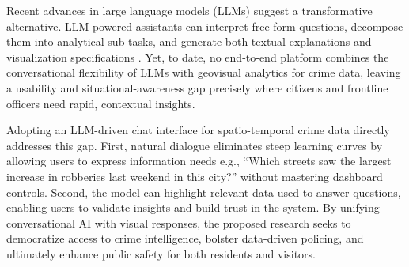 Recent advances in large language models (LLMs) suggest a transformative alternative. LLM-powered assistants can interpret free-form questions, decompose them into analytical sub-tasks, and generate both textual explanations and visualization specifications \cite{Zhang2024NLITabular}. Yet, to date, no end-to-end platform combines the conversational flexibility of LLMs with geovisual analytics for crime data, leaving a usability and situational-awareness gap precisely where citizens and frontline officers need rapid, contextual insights.

Adopting an LLM-driven chat interface for spatio-temporal crime data directly addresses this gap. First, natural dialogue eliminates steep learning curves by allowing users to express information needs e.g., “Which streets saw the largest increase in robberies last weekend in this city?” without mastering dashboard controls.  Second, the model can highlight relevant data used to answer questions, enabling users to validate insights and build trust in the system. By unifying conversational AI with visual responses, the proposed research seeks to democratize access to crime intelligence, bolster data-driven policing, and ultimately enhance public safety for both residents and visitors.







